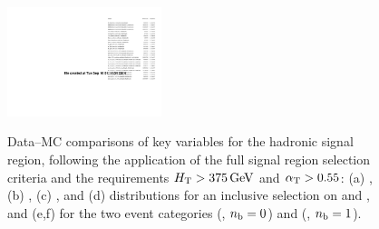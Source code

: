 \begin{figure}[h!]
{    \label{fig:figures_HT_0}
    \includegraphics[width=0.4\textwidth,page=123]{figures/data-mc/v21/had/hadronicLook_375_pfJet_ge2j.pdf}
  } 
   \\
  \caption{\label{fig:control-plots-sig} Data--MC comparisons of key
    variables for the hadronic signal region, following the
    application of the full signal region selection criteria and the
    requirements $\mbox{$H_\text{T}$} > 375\,\text{Ge\hspace{-.08em}V}$ and $\alpha_{\text{T}} > 0.55$: (a) \njet,
    (b) \nb, (c) \mht, and (d) \met distributions for an inclusive 
    selection on \njet and \nb, and (e,f) \scalht  for the two 
    event categories (\njetlow, $n_{\text{b}} = 0$) and (\njethigh, $n_{\text{b}} = 1$). }
\end{figure}

\FloatBarrier
